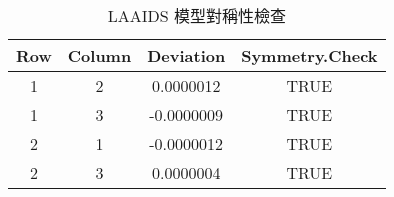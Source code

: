 \begin{table}[H]
    \centering
    \footnotesize
    \caption{LAAIDS 模型對稱性檢查} \label{laaids-sym}
    \begin{tabular}{cccc}
        \toprule
        Row & Column & Deviation & Symmetry.Check \\
        \midrule
        1 & 2 & 0.0000012 & TRUE \\
        1 & 3 & -0.0000009 & TRUE \\
        2 & 1 & -0.0000012 & TRUE \\
        2 & 3 & 0.0000004 & TRUE \\
        \bottomrule
    \end{tabular}
\end{table}
% 

\newpage
